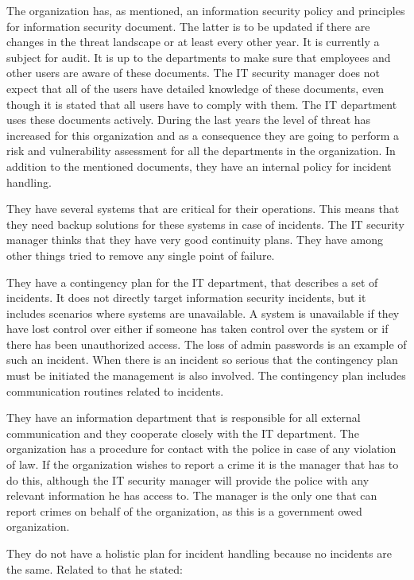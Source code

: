 The organization has, as mentioned, an information security policy and principles for information security document. The latter is to be updated if there are changes in the threat landscape or at least every other year. It is currently a subject for audit. It is up to the departments to make sure that employees and other users are aware of these documents. The IT security manager does not expect that all of the users have detailed knowledge of these documents, even though it is stated that all users have to comply with them. The IT department uses these documents actively. %
During the last years the level of threat has increased for this organization and as a consequence they are going to perform a risk and vulnerability assessment for all the departments in the organization. In addition to the mentioned documents, they have an internal policy for incident handling.

They have several systems that are critical for their operations. This means that they need backup solutions for these systems in case of incidents. The IT security manager thinks that they have very good continuity plans. They have among other things tried to remove any single point of failure.

They have a contingency plan for the IT department, that describes a set of incidents. It does not directly target information security incidents, but it includes scenarios where systems are unavailable. A system is unavailable if they have lost control over either if someone has taken control over the system or if there has been unauthorized access. The loss of admin passwords is an example of such an incident. When there is an incident so serious that the contingency plan must be initiated the management is also involved. The contingency plan includes communication routines related to incidents. 

They have an information department that is responsible for all external communication and they cooperate closely with the IT department. The organization has a procedure for contact with the police in case of any violation of law. If the organization wishes to report a crime it is the manager that has to do this, although the IT security manager will provide the police with any relevant information he has access to. The manager is the only one that can report crimes on behalf of the organization, as this is a government owed organization.

They do not have a holistic plan for incident handling because no incidents are the same. Related to that he stated:

